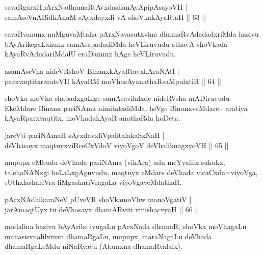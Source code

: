 
\begin{shl}
savaRgarxHpArxNadhamaRtAvxdashanAyApipAsayoVH |\\
samAseVnABidhAnaM sAyxdayxdi vA shoVkakAyaRtaH \hfill || 63 ||
\end{shl}

\begin{artha}
savaRvanunx nuMguvaMtaha pArxNavasutxvina dhamaRvAdadadxriMda hasivu  bAyArikegaLanunx samAsapadadiMda heVLiruvudu athavA shoVkada kAyaRvAdudariMdalU eraDanunx hAge heVLiruvudu.
\end{artha}

\begin{shl}
asamAseVna nideVRshoV BinanxkAyaRtavxkAraNAtf |\\
parxvaqtitxrarateVH kAyaRM moVhasAyxnathaRsaMpulxtiH \hfill || 64 ||
\end{shl}

\begin{artha}
shoVka moVha shabadxgaLige samAsavilalxde nideRVsha mADiruvudu EkeMdare Binanx pariNAma nimitatxdiMda, heVge BinanxveMdare:- aratiya kAyaRparxvaqtitx, moVhadakAyaR anathaRda hoDeta.
\end{artha}

\begin{shl}
jareVti pariNAmaH sAyxdavxliVpalitalakaSxNaH |\\
deVhasayx maqtuyxviRceCxVdoV viyoVgoV deVhaliknagxyoVH \hfill || 65 ||
\end{shl}

\begin{artha}
mupupx eMbudu deVhada pariNAma (vikAra) adu meYyalilx sukukx, talehaNANxgi beLaLxgAguvudu, maqtuyx eMdare deVhada vicaCxda=viyoVga, sUthxlashariVra liMgashariVragaLa viyoVgaveMdathaR.
\end{artha}


\begin{shl}
pArxNAdhikaraNeV pUveVR shoVkamoVhw manoVgatiV  |\\
jarAmaqtUyx tu deVhasayx dhamARviti vinishacxyaH \hfill || 66 ||
\end{shl}

\begin{artha}
modalina hasivu bAyArike ivugaLu pArxNada dhamaR, shoVka moVhagaLu manasisxnalilxruva dhamaRgaLu, mupupx, maraNagaLu deVhada dhamaRgaLeMdu niNaRyavu (Atamxna dhamaRvalalx).
\end{artha}

